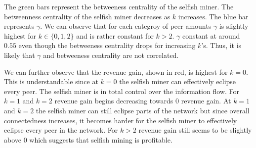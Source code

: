 The green bars represent the betweeness centrality of the selfish miner. The betweenness centrality of the selfish miner decreases as $k$ increases. The blue bar represents $\gamma$. We can observe that for each categroy of peer amounts $\gamma$ is slightly highest for $k \in \{0,1,2\}$ and is rather constant for $k>2$. $\gamma$  constant at around $0.55$ even though the betweeness centrality drops for increasing $k$'s. Thus, it is likely that $\gamma$ and  betweeness centrality are not correlated.

We can further observe that the revenue gain, shown in red, is highest for $k=0$. This is understandable since at $k=0$ the selfish miner can effectively eclipse every peer. The selfish miner is in total control over the information flow. For $k=1$ and $k=2$ revenue gain begins decreasing towards $0$ revenue gain. At $k=1$ and $k=2$ the selfish miner can still eclipse parts of the network but since overall connectedness increases, it becomes harder for the selfish miner to effectively eclipse every peer in the network. For $k>2$ revenue gain still seems to be slightly above $0$ which suggests that selfish mining is profitable.


\fi



















